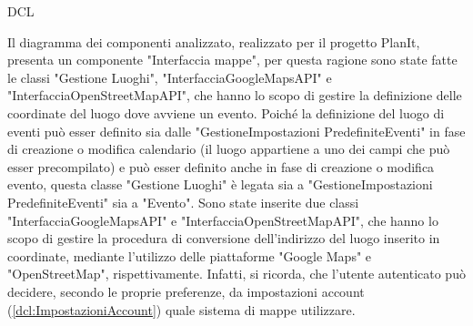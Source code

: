 \begin{listaPersonale}{DCL}
\begin{listaPersonale2}[DCL]{}
        Il diagramma dei componenti analizzato, realizzato per il progetto PlanIt, presenta un componente "Interfaccia mappe", per questa ragione sono state fatte le classi "Gestione Luoghi", "InterfacciaGoogleMapsAPI" e "InterfacciaOpenStreetMapAPI", che hanno lo scopo di gestire la definizione delle coordinate del luogo dove avviene un evento. Poiché la definizione del luogo di eventi può esser definito sia dalle "GestioneImpostazioni PredefiniteEventi" in fase di creazione o modifica calendario (il luogo appartiene a uno dei campi che può esser precompilato) e può esser definito anche in fase di creazione o modifica evento, questa classe "Gestione Luoghi" è legata sia a "GestioneImpostazioni PredefiniteEventi" sia a "Evento".
        Sono state inserite due classi "InterfacciaGoogleMapsAPI" e "InterfacciaOpenStreetMapAPI", che hanno lo scopo di gestire la procedura di conversione dell'indirizzo del luogo inserito in coordinate, mediante l'utilizzo delle piattaforme "Google Maps" e "OpenStreetMap", rispettivamente. Infatti, si ricorda, che l'utente autenticato può decidere, secondo le proprie preferenze, da impostazioni account (\ref{dcl:ImpostazioniAccount}) quale sistema di mappe utilizzare.
        \begin{center}
            
        \end{center}





\end{listaPersonale2}
\end{listaPersonale}
